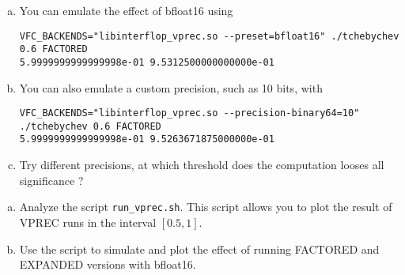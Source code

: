 \begin{question}
    \begin{enumerate}[(a)]
        \item You can emulate the effect of bfloat16 using
              \begin{verbatim}
VFC_BACKENDS="libinterflop_vprec.so --preset=bfloat16" ./tchebychev 0.6 FACTORED 
5.9999999999999998e-01 9.5312500000000000e-01
\end{verbatim}
        \item You can also emulate a custom precision, such as 10 bits, with
              \begin{verbatim}
VFC_BACKENDS="libinterflop_vprec.so --precision-binary64=10" ./tchebychev 0.6 FACTORED 
5.9999999999999998e-01 9.5263671875000000e-01
\end{verbatim}
        \item Try different precisions, at which threshold does the computation looses all significance ?
    \end{enumerate}
\end{question}

\begin{question}
    \begin{enumerate}[(a)]
        \item Analyze the script {\tt run\_vprec.sh}. This script allows you to plot the result of VPREC runs in the interval $[0.5,1]$.
        \item Use the script to simulate and plot the effect of running FACTORED and EXPANDED versions with bfloat16.
    \end{enumerate}
\end{question}
